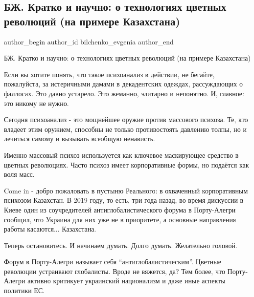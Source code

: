  
 
 
 
 
\subsection{БЖ. Кратко и научно: о технологиях цветных революций (на примере Казахстана)}
\label{sec:07_01_2022.tg.bilchenko_evgenia.1.kazahstan}

\ifcmt
 author_begin
   author_id bilchenko_evgenia
 author_end
\fi

БЖ. Кратко и научно: о технологиях цветных революций (на примере Казахстана)

Если вы хотите понять, что такое психоанализ в действии, не бегайте,
пожалуйста, за истеричными дамами в декадентских одеждах, рассуждающих о
фаллосах. Это давно устарело. Это жеманно, элитарно и непонятно. И, главное:
это никому не нужно.


Сегодня психоанализ - это мощнейшее оружие против массового психоза. Те, кто
владеет этим оружием, способны не только противостоять давлению толпы, но и
лечиться самому и вызывать всеобщую ненависть. 

Именно массовый психоз используется как ключевое маскирующее средство в цветных
революциях. Часто психоз имеет корпоративные формы, но подаётся как воля масс.

Come in  - добро пожаловать в пустыню Реального: в охваченный корпоративным
психозом Казахстан. В 2019 году, то есть, три года назад, во время дискуссии в
Киеве один из соучредителей антиглобалистического форума в Порту-Алегри
сообщил, что Украина для них уже не в приоритете, а основные направления работы
касаются... Казахстана.

Теперь остановитесь. И начинаем думать. Долго думать. Желательно головой. 

Форум в Порту-Алегри называет себя \enquote{антиглобалистическим}. Цветные революции
устраивают глобалисты. Вроде не вяжется, да? Тем более, что Порту-Алегри
активно критикует украинский национализм и даже иные аспекты политики ЕС.

